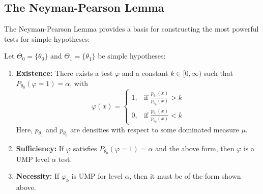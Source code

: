 \documentclass[open=any, 11pt,paper=A4]{scrreprt}
\begin{document}
\subsection{The Neyman-Pearson Lemma}
The Neyman-Pearson Lemma provides a basis for constructing the most powerful tests for simple hypotheses:
\begin{theorem}
Let \( \Theta_0 = \{\theta_0\}\) and \( \Theta_1 = \{\theta_1\}\) be simple hypotheses:
\begin{enumerate}
    \item \textbf{Existence:} There exists a test \( \varphi \) and a constant \( k \in [0, \infty) \) such that \( P_{\theta_0} (\varphi = 1) = \alpha \), with
    \[
    \varphi(x) = 
    \begin{cases}
      1, & \text{if } \frac{p_{\theta_1}(x)}{p_{\theta_0}(x)} > k \\
      0, & \text{if } \frac{p_{\theta_1}(x)}{p_{\theta_0}(x)} < k
    \end{cases}
    \]
    Here, \( p_{\theta_1} \) and \( p_{\theta_0} \) are densities with respect to some dominated measure \( \mu \).
    
    \item \textbf{Sufficiency:} If \( \varphi \) satisfies \( P_{\theta_0} (\varphi = 1) = \alpha \) and the above form, then \( \varphi \) is a UMP level \( \alpha \) test.
    
    \item \textbf{Necessity:} If \( \varphi_k \) is UMP for level \( \alpha \), then it must be of the form shown above.
\end{enumerate}
\end{theorem}
\end{document}
